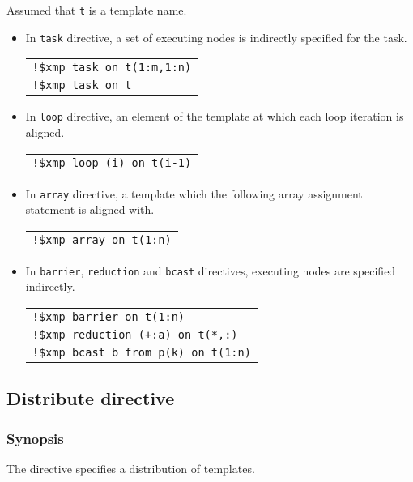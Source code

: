 Assumed that {\tt t} is a template name. 

\begin{itemize}
\item In {\tt task} directive, a set of executing nodes is indirectly specified for the task.

\begin{tabular}{l}
\verb|!$xmp task on t(1:m,1:n)| \\
\verb|!$xmp task on t| \\
\end{tabular}

\item In {\tt loop} directive, an element of the template at which each loop iteration is aligned.

\begin{tabular}{l}
\verb|!$xmp loop (i) on t(i-1)| \\
\end{tabular}

\item In {\tt array} directive, a template which the following array assignment statement is aligned with.

\begin{tabular}{l}
\verb|!$xmp array on t(1:n)| \\
\end{tabular}

\item In {\tt barrier}, {\tt reduction} and {\tt bcast} directives,
executing nodes are specified indirectly. 

\begin{tabular}{l}
\verb|!$xmp barrier on t(1:n)| \\
\verb|!$xmp reduction (+:a) on t(*,:)| \\
\verb|!$xmp bcast b from p(k) on t(1:n)| \\
\end{tabular}

\end{itemize}

\subsection{Distribute directive}

\subsubsection*{Synopsis}
The {\tt {}} directive specifies a distribution of templates. 

